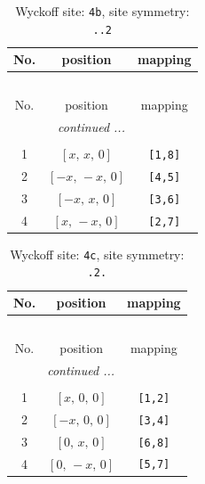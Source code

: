 \documentclass[fleqn,8pt]{jsarticle}
\begin{document}
\begin{longtable}{ccc}
\caption{Wyckoff site: {\tt 4b}, site symmetry: {\tt ..2}}
 \\
 \hline \hline
No. & position & mapping \\ \hline \endfirsthead

\multicolumn{2}{l}{\tablename\ \thetable{}} \\
 \hline \hline
No. & position & mapping \\ \hline \endhead

 \hline \hline
\multicolumn{2}{r}{\footnotesize\it continued ...} \\ \endfoot

 \hline \hline
\multicolumn{2}{r}{} \\ \endlastfoot

1 & $\left[ x,\, x,\, 0 \right]$ & {\tt [1,8]} \\ \hline
2 & $\left[ - x,\, - x,\, 0 \right]$ & {\tt [4,5]} \\ \hline
3 & $\left[ - x,\, x,\, 0 \right]$ & {\tt [3,6]} \\ \hline
4 & $\left[ x,\, - x,\, 0 \right]$ & {\tt [2,7]} \\
\end{longtable}
\renewcommand{\arraystretch}{1.2}
\begin{longtable}{ccc}
\caption{Wyckoff site: {\tt 4c}, site symmetry: {\tt .2.}}
 \\
 \hline \hline
No. & position & mapping \\ \hline \endfirsthead

\multicolumn{2}{l}{\tablename\ \thetable{}} \\
 \hline \hline
No. & position & mapping \\ \hline \endhead

 \hline \hline
\multicolumn{2}{r}{\footnotesize\it continued ...} \\ \endfoot

 \hline \hline
\multicolumn{2}{r}{} \\ \endlastfoot

1 & $\left[ x,\, 0,\, 0 \right]$ & {\tt [1,2]} \\ \hline
2 & $\left[ - x,\, 0,\, 0 \right]$ & {\tt [3,4]} \\ \hline
3 & $\left[ 0,\, x,\, 0 \right]$ & {\tt [6,8]} \\ \hline
4 & $\left[ 0,\, - x,\, 0 \right]$ & {\tt [5,7]} \\
\end{longtable}
\renewcommand{\arraystretch}{1.2}
\end{document}
